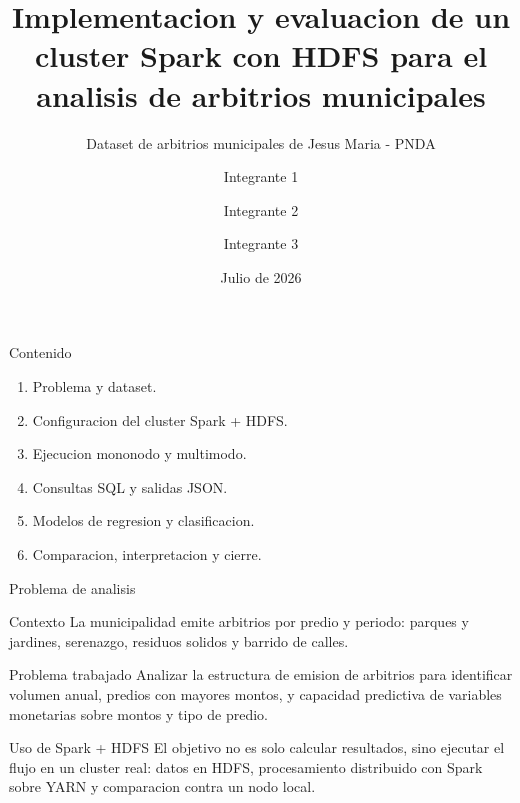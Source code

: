 \documentclass[aspectratio=169,11pt]{beamer}
\title[CC531 - Spark + HDFS]{Implementacion y evaluacion de un cluster Spark con HDFS para el analisis de arbitrios municipales}
\subtitle{Dataset de arbitrios municipales de Jesus Maria - PNDA}
\author{Integrante 1 \and Integrante 2 \and Integrante 3}
\institute{Universidad Nacional de Ingenieria \\ CC531 A - Analisis en Macrodatos}
\date{Julio de 2026}
\begin{document}
\begin{frame}
    \titlepage
\end{frame}

\begin{frame}{Contenido}
    \begin{enumerate}
        \item Problema y dataset.
        \item Configuracion del cluster Spark + HDFS.
        \item Ejecucion mononodo y multimodo.
        \item Consultas SQL y salidas JSON.
        \item Modelos de regresion y clasificacion.
        \item Comparacion, interpretacion y cierre.
    \end{enumerate}
\end{frame}

\begin{frame}{Problema de analisis}
    \begin{block}{Contexto}
        La municipalidad emite arbitrios por predio y periodo: parques y jardines, serenazgo, residuos solidos y barrido de calles.
    \end{block}

    \begin{block}{Problema trabajado}
        Analizar la estructura de emision de arbitrios para identificar volumen anual, predios con mayores montos, y capacidad predictiva de variables monetarias sobre montos y tipo de predio.
    \end{block}

    \begin{block}{Uso de Spark + HDFS}
        El objetivo no es solo calcular resultados, sino ejecutar el flujo en un cluster real: datos en HDFS, procesamiento distribuido con Spark sobre YARN y comparacion contra un nodo local.
    \end{block}
\end{frame}
\end{document}
